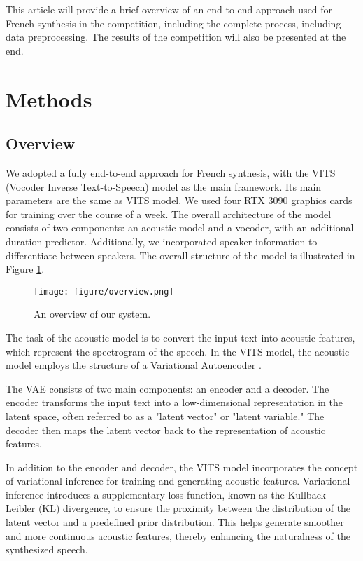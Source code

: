\documentclass{INTERSPEECH2023}
\begin{document}
This article will provide a brief overview of an end-to-end approach used for French synthesis in the competition, including the complete process, including data preprocessing. The results of the competition will also be presented at the end.


\section{Methods}

\subsection{Overview}

We adopted a fully end-to-end approach for French synthesis, with the VITS (Vocoder Inverse Text-to-Speech) model as the main framework\cite{kim2021conditional}. Its main parameters are the same as VITS model. We used four RTX 3090 graphics cards for training over the course of a week. The overall architecture of the model consists of two components: an acoustic model and a vocoder, with an additional duration predictor. Additionally, we incorporated speaker information to differentiate between speakers. The overall structure of the model is illustrated in Figure \ref{An-overview-of-our-system}.

\begin{figure}[h]
  \centering
  \texttt{[image: figure/overview.png]}
  \caption{An overview of our system.}
  \label{An-overview-of-our-system}
\end{figure}

The task of the acoustic model is to convert the input text into acoustic features, which represent the spectrogram of the speech. In the VITS model, the acoustic model employs the structure of a Variational Autoencoder \cite{kingma2013auto}.

The VAE consists of two main components: an encoder and a decoder. The encoder transforms the input text into a low-dimensional representation in the latent space, often referred to as a "latent vector" or "latent variable." The decoder then maps the latent vector back to the representation of acoustic features.

In addition to the encoder and decoder, the VITS model incorporates the concept of variational inference for training and generating acoustic features. Variational inference introduces a supplementary loss function, known as the Kullback-Leibler (KL) divergence, to ensure the proximity between the distribution of the latent vector and a predefined prior distribution. This helps generate smoother and more continuous acoustic features, thereby enhancing the naturalness of the synthesized speech.
\end{document}
